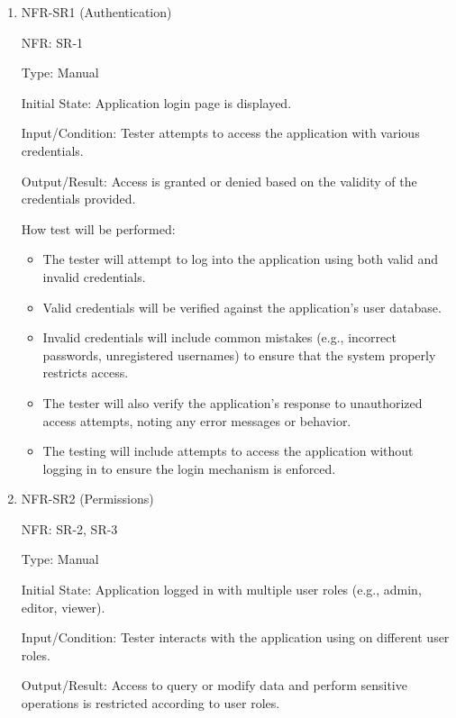 \documentclass[12pt, titlepage]{article}
\begin{document}
\begin{enumerate}

\item{NFR-SR1 (Authentication)\\}
  
  NFR: SR-1
  
  Type: Manual
  
  Initial State: Application login page is displayed.
  
  Input/Condition: Tester attempts to access the application with various credentials.
  
  Output/Result: Access is granted or denied based on the validity of the credentials
  provided.
  
  How test will be performed: 
  \begin{itemize}
    \item The tester will attempt to log into the application using both valid and
    invalid credentials.
    \item Valid credentials will be verified against the application's user database.
    \item Invalid credentials will include common mistakes (e.g., incorrect passwords,
    unregistered usernames) to ensure that the system properly restricts access.
    \item The tester will also verify the application's response to unauthorized access
    attempts, noting any error messages or behavior.
    \item The testing will include attempts to access the application without logging
    in to ensure the login mechanism is enforced.
  \end{itemize}

\item{NFR-SR2 (Permissions)\\}
  
  NFR: SR-2, SR-3
  
  Type: Manual
  
  Initial State: Application logged in with multiple user roles (e.g., admin, editor, viewer).
  
  Input/Condition: Tester interacts with the application using on different user roles.
  
  Output/Result: Access to query or modify data and perform sensitive operations is
  restricted according to user roles.
  

\end{enumerate}
\end{document}
